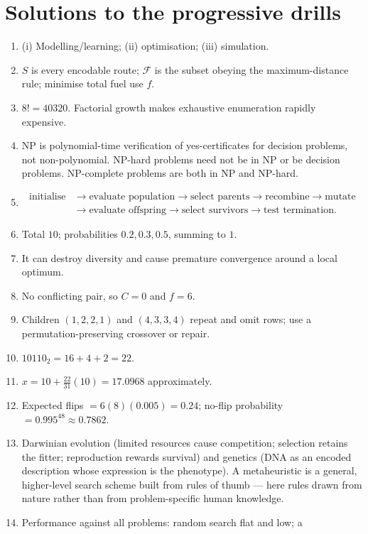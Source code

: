 \documentclass[11pt,a4paper]{article}
\begin{document}
\clearpage
\section{Solutions to the progressive drills}
\begin{enumerate}[label=\textbf{D\arabic*.}]
\item (i) Modelling/learning; (ii) optimisation; (iii) simulation.
\item $S$ is every encodable route; $\mathcal F$ is the subset obeying the maximum-distance rule; minimise total fuel use $f$.
\item $8!=40320$. Factorial growth makes exhaustive enumeration rapidly expensive.
\item NP is polynomial-time verification of yes-certificates for decision problems, not non-polynomial. NP-hard problems need not be in NP or be decision problems. NP-complete problems are both in NP and NP-hard.
\item
\[
\begin{aligned}
\text{initialise}&\to\text{evaluate population}\to\text{select parents}
\to\text{recombine}\to\text{mutate}\\
&\to\text{evaluate offspring}\to\text{select survivors}
\to\text{test termination}.
\end{aligned}
\]
\item Total $10$; probabilities $0.2,0.3,0.5$, summing to $1$.
\item It can destroy diversity and cause premature convergence around a local optimum.
\item No conflicting pair, so $C=0$ and $f=6$.
\item Children $(1,2,2,1)$ and $(4,3,3,4)$ repeat and omit rows; use a permutation-preserving crossover or repair.
\item $10110_2=16+4+2=22$.
\item $x=10+\frac{22}{31}(10)=17.0968$ approximately.
\item Expected flips $=6(8)(0.005)=0.24$; no-flip probability $=0.995^{48}\approx0.7862$.
\item Darwinian evolution (limited resources cause competition; selection
retains the fitter; reproduction rewards survival) and genetics (DNA as an
encoded description whose expression is the phenotype). A metaheuristic is a
general, higher-level search scheme built from rules of thumb --- here rules
drawn from nature rather than from problem-specific human knowledge.
\item Performance against all problems: random search flat and low; a

\end{enumerate}
\end{document}
